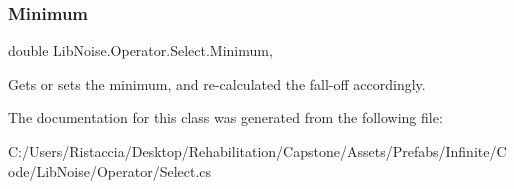 \subsubsection{\texorpdfstring{Minimum}{Minimum}}
{\footnotesize\ttfamily double Lib\+Noise.\+Operator.\+Select.\+Minimum\hspace{0.3cm}{\ttfamily [get]}, {\ttfamily [set]}}



Gets or sets the minimum, and re-\/calculated the fall-\/off accordingly. 



The documentation for this class was generated from the following file\+:\begin{DoxyCompactItemize}
\item 
C\+:/\+Users/\+Ristaccia/\+Desktop/\+Rehabilitation/\+Capstone/\+Assets/\+Prefabs/\+Infinite/\+Code/\+Lib\+Noise/\+Operator/Select.\+cs\end{DoxyCompactItemize}
